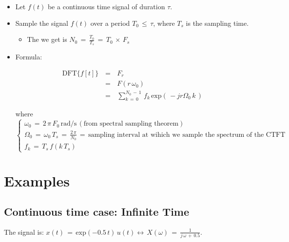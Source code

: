 \begin{itemize}

\item Let $f(t)$ be a continuous time signal of duration $\tau$.

\item Sample the signal $f(t)$ over a period $T_0 \, \leq \, \tau$, where $T_s$ is the sampling time. 

	\begin{itemize}
	\item The  we get is $N_0 \, = \, \displaystyle\frac{T_0}{T_s} \, = \, T_0 \, \times \, F_s$
	\end{itemize}

\item Formula:

\begin{equation}
\begin{array}{rcl}
\text{DFT}\{f[t]\} \, &=&\, F_r \\
						&=& \, F(r \, \omega_0) \\
					   &=&\, \displaystyle\sum_{k \, = \, 0}^{N_0 \, - \, 1} \, f_k \, \text{exp} \left(\, -j r \Omega_0 \, k   \,\right)
\end{array}
\end{equation}

where $\begin{cases}

\omega_0 \, = \, 2 \, \pi \, F_0 \, \text{rad/s} \, (\text{from spectral sampling theorem}) \\
\Omega_0 \, = \, \omega_0 \, T_s \, = \,   \displaystyle\frac{2 \, \pi}{N_0} \, = \, \text{sampling interval at wihich we sample the spectrum of the CTFT} \\
f_k \, = \, T_s \, f(k \, T_s)
\end{cases}$ 



\end{itemize}


\section{Examples}

\subsection{Continuous time case: Infinite Time}
\label{Sub:DFT:Continuous_time_Infinite_Time}

The signal is: $x(t) \, = \, \text{exp}(-0.5 \, t) \, u(t) \leftrightarrow \, X(\omega) \, = \, \displaystyle\frac{1}{j \, \omega\, + \, 0.5}$.\\

